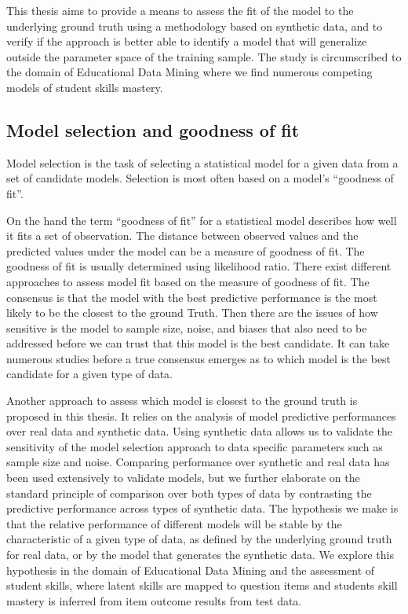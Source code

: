 This thesis aims to provide a means to assess the fit of the model to the underlying ground truth using a methodology based on synthetic data, and to verify if the approach is better able to identify a model that will generalize outside the parameter space of the training sample. The study is circumscribed to the domain of Educational Data Mining where we find numerous competing models of student skills mastery.

\subsection{Model selection and goodness of fit}

Model selection is the task of selecting a statistical model for a given data from a set of candidate models. Selection is most often based on a model's ``goodness of fit''.

On the hand the term ``goodness of fit'' for a statistical model describes how well it fits a set of observation. The distance between observed values and the predicted values under the model can be a measure of goodness of fit. The goodness of fit is usually determined using likelihood ratio. There exist different approaches to assess model fit based on the measure of goodness of fit. The consensus is that the model with the best predictive performance is the most likely to be the closest to the ground Truth. Then there are the issues of how sensitive is the model to sample size, noise, and biases that also need to be addressed before we can trust that this model is the best candidate. It can take numerous studies before a true consensus emerges as to which model is the best candidate for a given type of data.

Another approach to assess which model is closest to the ground truth is proposed in this thesis. It relies on the analysis of model predictive performances over real data and synthetic data. Using synthetic data allows us to validate the sensitivity of the model selection approach to data specific parameters such as sample size and noise. Comparing performance over synthetic and real data has been used extensively to validate models, but we further elaborate on the standard principle of comparison over both types of data by contrasting the predictive performance across types of synthetic data. The hypothesis we make is that the relative performance of different models will be stable by the characteristic of a given type of data, as defined by the underlying ground truth for real data, or by the model that generates the synthetic data. We explore this hypothesis in the domain of Educational Data Mining and the assessment of student skills, where latent skills are mapped to question items and students skill mastery is inferred from item outcome results from test data. 


